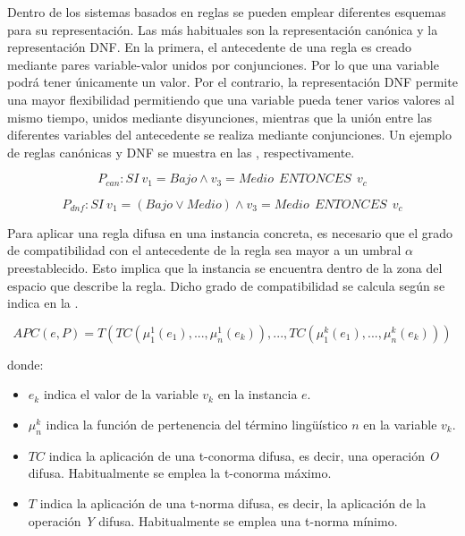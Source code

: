 \documentclass[c5paper,10pt,twoside]{book}	   	%
\begin{document}
Dentro de los sistemas basados en reglas se pueden emplear diferentes esquemas para su representación. Las más habituales son la representación canónica y la representación \ac{DNF}. En la primera, el antecedente de una regla es creado mediante pares variable-valor unidos por conjunciones. Por lo que una variable podrá tener únicamente un valor. Por el contrario, la representación \ac{DNF} permite una mayor flexibilidad permitiendo que una variable pueda tener varios valores al mismo tiempo, unidos mediante disyunciones, mientras que la unión entre las diferentes variables del antecedente se realiza mediante conjunciones. Un ejemplo de reglas canónicas y \ac{DNF} se muestra en las , respectivamente.

\begin{equation}
\label{eq:can}
P_{can}:SI~v_1 = \mathit{Bajo} \wedge v_3 = \mathit{Medio}~~ENTONCES~~ v_c
\end{equation}

\begin{equation}
\label{eq:dnf}
	P_{dnf}:SI~v_1 = \left(\mathit{Bajo} \vee \mathit{Medio} \right) \wedge v_3 = \mathit{Medio}~~ENTONCES~~v_c
\end{equation}


Para aplicar una regla difusa en una instancia concreta, es necesario que el grado de compatibilidad con el antecedente de la regla sea mayor a un umbral $\alpha$ preestablecido. Esto implica que la instancia se encuentra dentro de la zona del espacio que describe la regla. Dicho grado de compatibilidad se calcula según se indica en la .

\begin{equation} \label{eq:apc}
APC(e, P) = T\left( TC\left(\mu_1^1(e_1),...,\mu_n^1(e_k)\right) , ... , TC\left(\mu_1^k(e_1),...,\mu_n^k(e_k)\right)  \right)
\end{equation}

\noindent donde: 

\begin{itemize}
	\item $e_k$ indica el valor de la variable $v_k$ en la instancia $e$.
	\item $\mu_n^k$ indica la función de pertenencia del término lingüístico $n$ en la variable $v_k$.
	\item $TC$ indica la aplicación de una t-conorma difusa, es decir, una operación \textit{O} difusa. Habitualmente se emplea la t-conorma máximo.
	\item $T$ indica la aplicación de una t-norma difusa, es decir, la aplicación de la operación \textit{Y} difusa. Habitualmente se emplea una t-norma mínimo.
\end{itemize}
\end{document}
